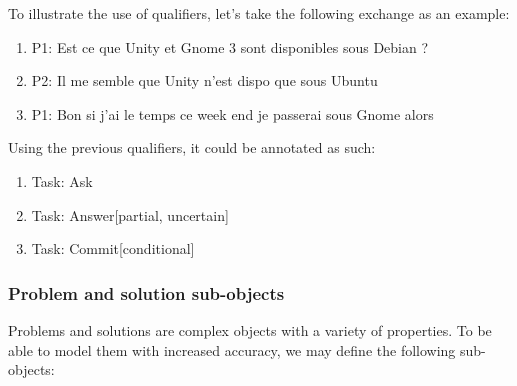 To illustrate the use of qualifiers, let's take the following exchange as an example:

\begin{enumerate}
	\item P1: Est ce que Unity et Gnome 3 sont disponibles sous Debian ?
	\item P2: Il me semble que Unity n'est dispo que sous Ubuntu
	\item P1: Bon si j'ai le temps ce week end je passerai sous Gnome alors
\end{enumerate}

Using the previous qualifiers, it could be annotated as such:

\begin{enumerate}
	\item Task: Ask
	\item Task: Answer[partial, uncertain]
	\item Task: Commit[conditional]
\end{enumerate}

\subsubsection{Problem and solution sub-objects}

Problems and solutions are complex objects with a variety of properties. To be able to model them with increased accuracy, we may define the following sub-objects:

